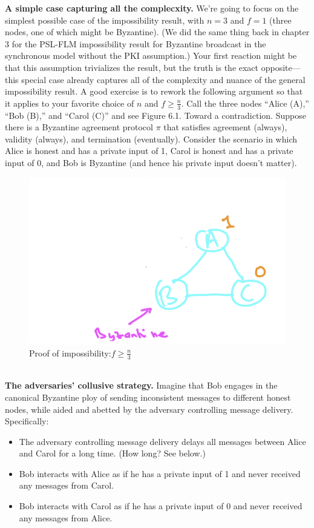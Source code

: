 \noindent
\textbf{A simple case capturing all the complecxity.} We’re going to focus on the simplest possible case of the impossibility result, with $n = 3$ and $f = 1$ (three nodes, one of which
might be Byzantine). (We did the same thing back in chapter 3 for the PSL-FLM impossibility result for Byzantine broadcast in the synchronous model without the PKI assumption.)
Your first reaction might be that this assumption trivializes the result, but the truth is the
exact opposite—this special case already captures all of the complexity and nuance of the
general impossibility result. A good exercise is to rework the following argument so that it
applies to your favorite choice of $n$ and $f \geq \frac{n}{3}$.
Call the three nodes “Alice (A),” “Bob (B),” and “Carol (C)” and see Figure 6.1. Toward
a contradiction. Suppose there is a Byzantine agreement protocol $\pi$ that satisfies agreement
(always), validity (always), and termination (eventually). Consider the scenario in which
Alice is honest and has a private input of 1, Carol is honest and has a private input of 0,
and Bob is Byzantine (and hence his private input doesn't matter).\\

\begin{figure}[h]
    \centering
    \includegraphics[scale = 0.5]{figures/f20.png}
    \caption{Proof of impossibility:$f \geq \frac{n}{3}$}
    \label{fig:mesh1}
\end{figure}\\

\noindent
\textbf{The adversaries’ collusive strategy.} Imagine that Bob engages in the canonical Byzantine ploy of sending inconsistent messages to different honest nodes, while aided and abetted by the adversary controlling message delivery. Specifically:
\begin{itemize}
    \item The adversary controlling message delivery delays all messages between Alice and Carol
for a long time. (How long? See below.)
    \item Bob interacts with Alice as if he has a private input of 1 and never received any
messages from Carol.
    \item Bob interacts with Carol as if he has a private input of 0 and never received any
messages from Alice.
\end{itemize}

